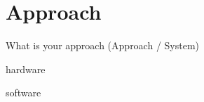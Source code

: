 \documentclass[class=article, crop=false]{standalone}
\begin{document}
\chapter{Approach}\label{cha:approach}

What is your approach (Approach / System)

{hardware}

{software}
\end{document}
